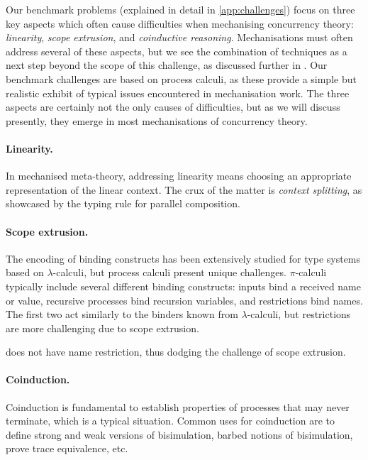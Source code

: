 \documentclass[runningheads]{llncs}
\begin{document}
Our benchmark problems (explained in detail in \cref{app:challenges}) focus on three key aspects which often cause difficulties when mechanising concurrency theory: \emph{linearity}, \emph{scope extrusion}, and \emph{coinductive reasoning}.
Mechanisations must often address several of these aspects, but we see the combination of techniques as a next step beyond the scope of this challenge, as discussed further in .
Our benchmark challenges are based on process calculi, as these provide a simple but realistic exhibit of typical issues encountered in mechanisation work.
The three aspects are certainly not the only causes of difficulties, but as we will discuss presently, they emerge in most mechanisations of concurrency theory.

\paragraph{Linearity.}
In mechanised meta-theory, addressing linearity means choosing an appropriate representation of the linear context.
The crux of the matter is \emph{context splitting}, as showcased by the typing rule for parallel composition.


\paragraph{Scope extrusion.}
The encoding of binding constructs has been extensively studied for type systems based on $\lambda$-calculi, but process calculi present unique challenges.
$\pi$-calculi typically include several different binding constructs: inputs bind a received name or value, recursive processes bind recursion variables, and restrictions bind names.
The first two act similarly to the binders known from $\lambda$-calculi, but restrictions are more challenging due to scope extrusion.


\cite{Maksimovic2015} does not have name restriction, thus dodging the challenge of scope extrusion.

\paragraph{Coinduction.} 
Coinduction is fundamental to establish properties of processes that
may never terminate, which is a typical situation.
Common uses for coinduction are to define strong and weak versions of
bisimulation, barbed notions of bisimulation, prove trace equivalence,
etc.
\end{document}
